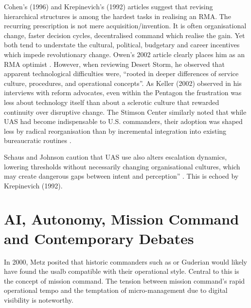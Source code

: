 Cohen's (1996) and Krepinevich's (1992) articles suggest that revising hierarchical structures is among the hardest tasks in realising an RMA. The recurring prescription is not mere acquisition/invention. It is often organisational change, faster decision cycles, decentralised command which realise the gain. Yet both tend to understate the cultural, political, budgetary and career incentives which impede revolutionary change\nocite{COHEN_1995,COHEN_1996,KREP_1992}. Owen's 2002 article clearly places him as an RMA optimist \nocite{OWENS_2002}. However, when reviewing Desert Storm, he observed that apparent technological difficulties were, ``rooted in deeper differences of service culture, procedures, and operational concepts''. As Keller (2002) observed in his interviews with reform advocates, even within the Pentagon the frustration was less about technology itself than about a sclerotic culture that rewarded continuity over disruptive change\nocite{KELLER_2002}. The Stimson Center similarly noted that while UAS had become indispensable to U.S. commanders, their adoption was shaped less by radical reorganisation than by incremental integration into existing bureaucratic routines \parencite{STIMSON_2015}.

 Schaus and Johnson caution that UAS use also alters escalation dynamics, lowering thresholds without necessarily changing organisational cultures, which may create dangerous gaps between intent and perception” \parencite{SCHAUS_2018}. This is echoed by Krepinevich (1992).


\section{AI, Autonomy, Mission Command and Contemporary Debates} 
In 2000, Metz  posited that historic commanders such as  or Guderian would likely have found the \gls{usalb} compatible with their operational style\nocite{Metz_2000}. Central to this is the concept of mission command. The tension between mission command's rapid operational tempo and the temptation of micro-management due to digital visibility is noteworthy.

